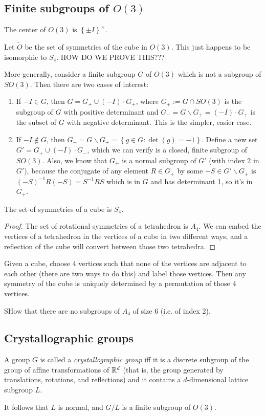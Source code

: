 \documentclass[class=article, crop=false]{standalone}
\begin{document}
\subsection{Finite subgroups of $O(3)$}
The center of $O(3)$ is $ \left\{ \pm I \right\}^ \times$.
\par
Let $\widetilde{O}$ be the set of symmetries of the cube in $O(3)$. This just happens to be isomorphic to $S_4$. HOW DO WE PROVE THIS???
\par
More generally, consider a finite subgroup $G$ of $O(3)$ which is not a subgroup of $SO(3)$. Then there are two cases of interest:
\begin{enumerate}
    \item If $-I \in G$, then $G = G_+ \cup (-I) \cdot G_+$, where $G_+ := G \cap SO(3)$ is the subgroup of $G$ with positive determinant and $G_- = G \backslash G_+ = (-I) \cdot G_+$ is the subset of $G$ with negative determinant. This is the simpler, easier case.
    \item If $-I \not\in G$, then $G_- = G \backslash G_+ = \left\{ g \in G : \det (g)=-1 \right\}$. Define a new set $G' = G_+ \cup (-I) \cdot G_-$, which we can verify is a closed, finite subgroup of $SO(3)$. Also, we know that $G_+$ is a normal subgroup of $G'$ (with index 2 in $G'$), because the conjugate of any element $R \in G_+$ by some $-S \in G' \backslash G_+$ is $(-S)^{-1}R(-S)=S^{-1}RS$ which is in $G$ and has determinant 1, so it's in $G_+$.
\end{enumerate}
\begin{thm}
    The set of symmetries of a cube is $S_4$.
\end{thm}
\begin{proof}
    The set of rotational symmetries of a tetrahedron is $A_4$. We can embed the vertices of a tetrahedron in the vertices of a cube in two different ways, and a reflection of the cube will convert between those two tetrahedra.
\end{proof}
\begin{cor}
    Given a cube, choose 4 vertices such that none of the vertices are adjacent to each other (there are two ways to do this) and label those vertices. Then any symmetry of the cube is uniquely determined by a permutation of those 4 vertices.
\end{cor}
\begin{prob}
    SHow that there are no subgroups of $A_4$ of size 6 (i.e. of index 2).
\end{prob}

\subsection{Crystallographic groups}
A group $G$ is called a \emph{crystallographic group} iff it is a discrete subgroup of the group of affine transformations of $\mathbb{R}^d$ (that is, the group generated by translations, rotations, and reflections) and it contains a $d$-dimensional lattice subgroup $L$.
\par
It follows that $L$ is normal, and $G/L$ is a finite subgroup of $O(3)$.
\end{document}
